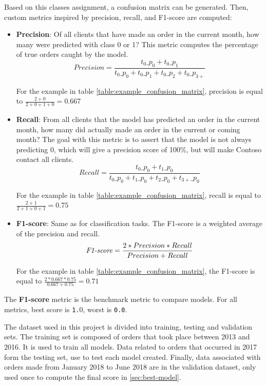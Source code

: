 Based on this classes assignment, a confusion matrix can be generated. Then, custom metrics inspired by precision, recall, and F1-score are computed:
\begin{itemize}
    \item \textbf{Precision}: Of all clients that have made an order in the current month, how many were predicted with class 0 or 1? This metric computes the percentage of true orders caught by the model. 
    $$ Precision = \frac{t_0\_p_0 + t_0\_p_1}{t_0\_p_0 + t_0\_p_1 + t_0\_p_2 + t_0\_p_{3+}} $$
    
    For the example in table \ref{table:example_confusion_matrix}, precision is equal to $\frac{2+0}{2+0+1+0} = 0.667$
    
    \item \textbf{Recall}: From all clients that the model has predicted an order in the current month, how many did actually made an order in the current or coming month? The goal with this metric is to assert that the model is not always predicting 0, which will give a precision score of 100\%, but will make Contoso contact all clients. 
    $$ Recall = \frac{t_0\_p_0 + t_1\_p_0}{t_0\_p_0 + t_1\_p_0 + t_2\_p_0 + t_{3+}\_p_0} $$
    
    For the example in table \ref{table:example_confusion_matrix}, recall is equal to $\frac{2+1}{2+1+0+1} = 0.75$
    
    \item \textbf{F1-score}: Same as for classification tasks. The F1-score is a weighted average of the precision and recall.
    $$ \operatorname{\textit{F1-score}} = \frac{2*Precision*Recall}{Precision+Recall} $$

    For the example in table \ref{table:example_confusion_matrix}, the F1-score is equal to $\frac{2*0.667*0.75}{0.667+0.75} = 0.71$
\end{itemize}



The \textbf{F1-score} metric is the benchmark metric to compare models. For all metrics, best score is \texttt{1.}0, worst is \texttt{0.0}.

The dataset used in this project is divided into training, testing and validation sets. The training set is composed of orders that took place between 2013 and 2016. It is used to train all models. Data related to orders that occurred in 2017 form the testing set, use to test each model created. Finally, data associated with orders made from January 2018 to June 2018 are in the validation dataset, only used once to compute the final score in \ref{sec:best-model}.

